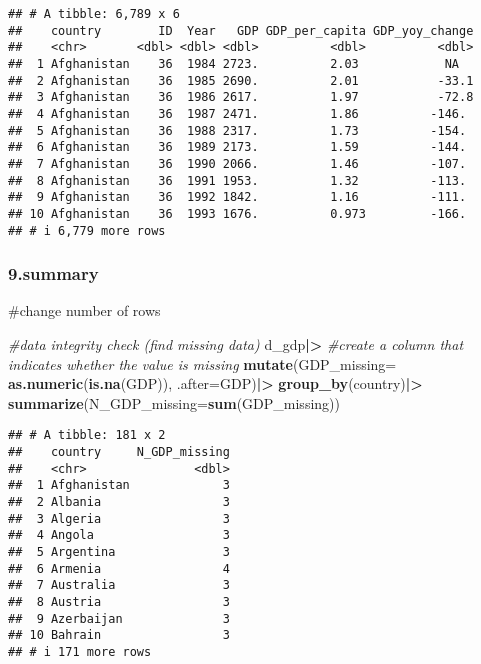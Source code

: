 \documentclass[
]{article}
\newenvironment{Shaded}{\begin{snugshade}}{\end{snugshade}}
\newcommand{\AttributeTok}[1]{\textcolor[rgb]{0.13,0.29,0.53}{#1}}
\newcommand{\CommentTok}[1]{\textcolor[rgb]{0.56,0.35,0.01}{\textit{#1}}}
\newcommand{\FunctionTok}[1]{\textcolor[rgb]{0.13,0.29,0.53}{\textbf{#1}}}
\newcommand{\NormalTok}[1]{#1}
\newcommand{\SpecialCharTok}[1]{\textcolor[rgb]{0.81,0.36,0.00}{\textbf{#1}}}
\begin{document}
\begin{verbatim}
## # A tibble: 6,789 x 6
##    country        ID  Year   GDP GDP_per_capita GDP_yoy_change
##    <chr>       <dbl> <dbl> <dbl>          <dbl>          <dbl>
##  1 Afghanistan    36  1984 2723.          2.03            NA  
##  2 Afghanistan    36  1985 2690.          2.01           -33.1
##  3 Afghanistan    36  1986 2617.          1.97           -72.8
##  4 Afghanistan    36  1987 2471.          1.86          -146. 
##  5 Afghanistan    36  1988 2317.          1.73          -154. 
##  6 Afghanistan    36  1989 2173.          1.59          -144. 
##  7 Afghanistan    36  1990 2066.          1.46          -107. 
##  8 Afghanistan    36  1991 1953.          1.32          -113. 
##  9 Afghanistan    36  1992 1842.          1.16          -111. 
## 10 Afghanistan    36  1993 1676.          0.973         -166. 
## # i 6,779 more rows
\end{verbatim}

\hypertarget{summary}{%
\subsubsection{9.summary}\label{summary}}

\#change number of rows

\begin{Shaded}
\begin{Highlighting}[]
\CommentTok{\#data integrity check (find missing data)}
\NormalTok{d\_gdp}\SpecialCharTok{|\textgreater{}}
  \CommentTok{\#create a column that indicates whether the value is missing}
  \FunctionTok{mutate}\NormalTok{(}\AttributeTok{GDP\_missing=} \FunctionTok{as.numeric}\NormalTok{(}\FunctionTok{is.na}\NormalTok{(GDP)), }\AttributeTok{.after=}\NormalTok{GDP)}\SpecialCharTok{|\textgreater{}}
           \FunctionTok{group\_by}\NormalTok{(country)}\SpecialCharTok{|\textgreater{}}
           \FunctionTok{summarize}\NormalTok{(}\AttributeTok{N\_GDP\_missing=}\FunctionTok{sum}\NormalTok{(GDP\_missing))}
\end{Highlighting}
\end{Shaded}

\begin{verbatim}
## # A tibble: 181 x 2
##    country     N_GDP_missing
##    <chr>               <dbl>
##  1 Afghanistan             3
##  2 Albania                 3
##  3 Algeria                 3
##  4 Angola                  3
##  5 Argentina               3
##  6 Armenia                 4
##  7 Australia               3
##  8 Austria                 3
##  9 Azerbaijan              3
## 10 Bahrain                 3
## # i 171 more rows
\end{verbatim}
\end{document}
